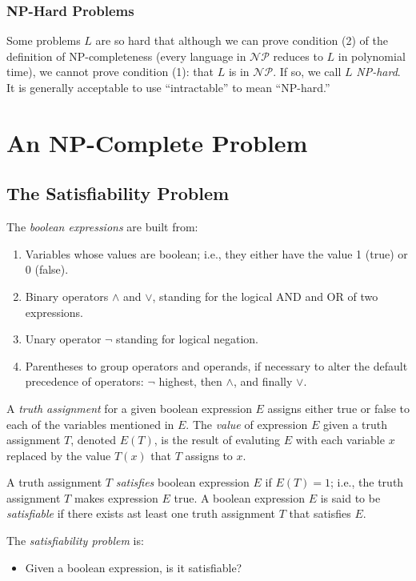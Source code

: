 \documentclass[]{article}
\begin{document}
\subsubsection*{NP-Hard Problems}
Some problems $L$ are so hard that although we can prove condition (2) of the
definition of NP-completeness (every language in $\mathcal{NP}$ reduces to $L$
in polynomial time), we cannot prove condition (1): that $L$ is in
$\mathcal{NP}$. If so, we call $L$ \emph{NP-hard}. It is generally acceptable to
use ``intractable'' to mean ``NP-hard.''

\section*{An NP-Complete Problem}
\subsection*{The Satisfiability Problem}
The \emph{boolean expressions} are built from:
\begin{enumerate}
\item Variables whose values are boolean; i.e., they either have the value 1
(true) or 0 (false).
\item Binary operators $\wedge$ and $\vee$, standing for the logical AND and OR
of two expressions.
\item Unary operator $\neg$ standing for logical negation.
\item Parentheses to group operators and operands, if necessary to alter the
default precedence of operators: $\neg$ highest, then $\wedge$, and finally
$\vee$.
\end{enumerate}
A \emph{truth assignment} for a given boolean expression $E$ assigns either true
or false to each of the variables mentioned in $E$. The \emph{value} of
expression $E$ given a truth assignment $T$, denoted $E(T)$, is the result of
evaluting $E$ with each variable $x$ replaced by the value $T(x)$ that $T$
assigns to $x$.

A truth assignment $T$ \emph{satisfies} boolean expression $E$ if $E(T) = 1$;
i.e., the truth assignment $T$ makes expression $E$ true. A boolean expression
$E$ is said to be \emph{satisfiable} if there exists ast least one truth
assignment $T$ that satisfies $E$.

The \emph{satisfiability problem} is:
\begin{itemize}
\item Given a boolean expression, is it satisfiable?
\end{itemize}
\end{document}
